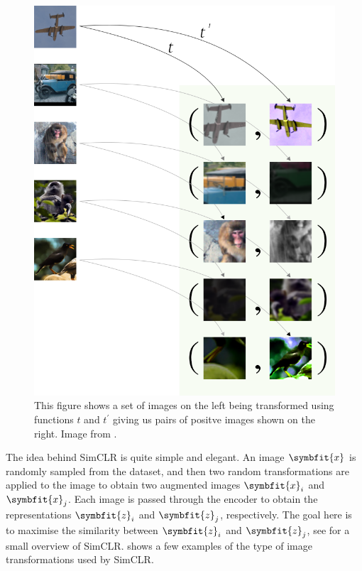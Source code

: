 \begin{figure}[t]
    \centering
    \includegraphics[scale=0.3]{chapters/assets/ssl_figs/positives-pairs.png}
    \caption{This figure shows a set of images on the left being transformed using functions $t$ and $t^\prime$ giving us pairs of positve images shown on the right. Image from \parencite{silva2021reprlearning}.}
    \label{fig:positive-pairs}
\end{figure}

The idea behind SimCLR is quite simple and elegant. An image $\symbfit{x}$ is randomly sampled from the dataset, and then two random transformations are applied to the image to obtain two augmented images $\symbfit{x}_i$ and $\symbfit{x}_j$. Each image is passed through the encoder to obtain the representations $\symbfit{z}_i$ and $\symbfit{z}_j$, respectively. The goal here is to maximise the similarity between $\symbfit{z}_i$ and $\symbfit{z}_j$, see  for a small overview of SimCLR.  shows a few examples of the type of image transformations used by SimCLR.

